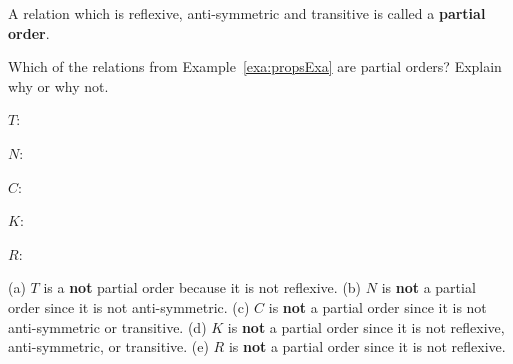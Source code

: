 \begin{df}
A relation which is
reflexive, anti-symmetric and transitive is called a {\bf partial
order}.
\end{df}


\begin{exer}
Which of the relations from Example~\ref{exa:propsExa} are partial orders?  Explain why or why not.
\begin{lenum}
\item $T$: \blanklinefill  

\blanklinefill
\item $N$: \blanklinefill 

\blanklinefill
\item $C$: \blanklinefill

\blanklinefill
\item $K$: \blanklinefill

\blanklinefill
\item $R$: \blanklinefill

\blanklinefill
\end{lenum}
\begin{answer}
(a) $T$ is a {\bf not} partial order because it is not reflexive.
(b) $N$ is {\bf not} a partial order since it is not anti-symmetric.
(c) $C$ is {\bf not} a partial order since it is not anti-symmetric or transitive.
(d) $K$ is {\bf not} a partial order since it is not reflexive, anti-symmetric, or transitive.
(e) $R$ is {\bf not} a partial order since it is not reflexive.
\end{answer}
\end{exer}

